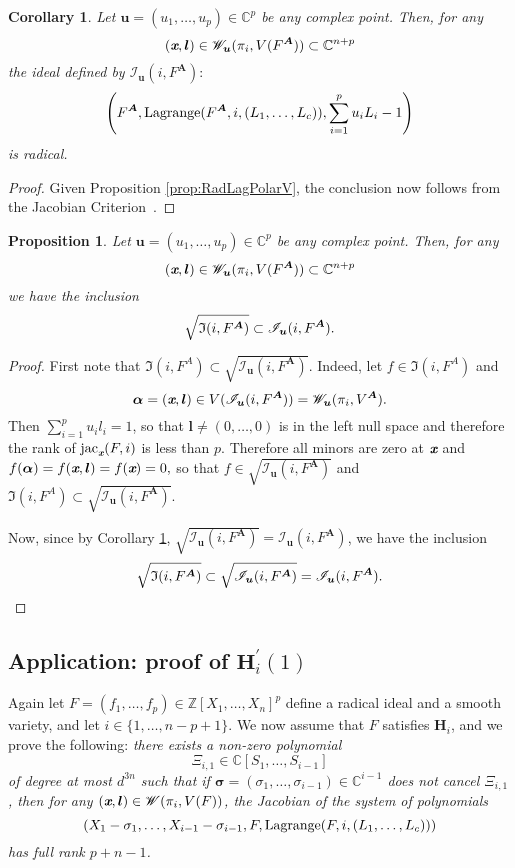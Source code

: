 \documentclass[a4paper]{article}
\def\sW{\mathscr{W}}
\def\sI{\mathscr{I}}
\def\mA{{\bm A}}
\def\ub{{\bm u}}
\def\lb{{\bm l}}
\def\xb{\textit{\textbf{x}}}
\DeclareMathOperator{\jac}{jac}
\DeclareMathOperator{\lag}{Lagrange}
\newcommand{\ZZ}{{\mathbb{Z}}}
\def\C{\mathbb{C}}
\def\IiA{\mathfrak{I}(i,F^A)}
\def\lagF{{\bm\lag}(F,i,(L_1,\hdots,L_c))}
\def\lagFA{{\bm\lag}(F^{\mA},i,(L_1,\hdots,L_c))}
\def\IilA{\mathscr{I}_{\ub}(i,F^{\mA})}
\def\WilA{\mathscr{W}_{\ub}(\pi_i,V^{\mA})}
\newtheorem{corollary}[theorem]{Corollary}
\newtheorem{prop}[theorem]{Proposition}
\begin{document}
    \begin{corollary}\label{cor:LagIdealRadical}
Let $\ub = (u_1,\hdots,u_p) \in \C^p$ be any complex point. Then, for any \[(\xb,\lb)\in \mathscr{W}_{\ub}(\pi_i,V(F^{\mA})) \subset \C^{n+p}\] the ideal defined by $\sI_{\ub}(i,F^{\mA}) :$\[ \left(F^{\mA},\lagFA,\sum_{i=1}^p u_iL_i-1\right)\] is radical.
    \end{corollary}
    \begin{proof}
    Given Proposition \ref{prop:RadLagPolarV}, the conclusion now follows from the Jacobian Criterion~\cite[Corollary 16.20]{ECA}.
    \end{proof}
    \begin{prop}\label{prop:polarVs2}
Let $\ub = (u_1,\hdots,u_p) \in \C^p$ be any complex point. Then, for any \[(\xb,\lb)\in \mathscr{W}_{\ub}(\pi_i,V(F^{\mA})) \subset \C^{n+p}\]we have the inclusion
    \[
    \sqrt{\frak{I}(i,F^{\mA})} \subset \IilA.
    \]
    \end{prop}
    \begin{proof}
    First note that $\IiA \subset \sqrt{\IilA}.$ Indeed, let $f \in \IiA$ and \[\bm \alpha = (\xb,\lb) \in V(\IilA)=\WilA.\] Then $\sum_{i=1}^p u_i l_i = 1$, so that $\lb \not = (0,\hdots,0)$ is in the left null space and therefore the rank of $\jac_{\xb} (F,i)$ is less than $p.$ Therefore all minors are zero at $\xb$ and $f(\bm \alpha)= f(\xb,\lb)=f(\xb)=0,$ so that $f \in \sqrt{\IilA}$ and $\IiA \subset \sqrt{\IilA}.$
    \par 
    Now, since by Corollary \ref{cor:LagIdealRadical}, $\sqrt{\IilA} = \IilA$, we have the inclusion
    \[
    \sqrt{\frak{I}(i,F^{\mA})} \subset \sqrt{\IilA} = \IilA.
    \]
    \end{proof}


\subsection{Application: proof of $\textbf{H}_i^{'}(1)$}\label{proof:hip}
Again let $F = (f_1,\hdots,f_p) \in \ZZ[X_1,\hdots,X_n]^p$  define a radical ideal and a smooth variety, and let $i\in \{1,\hdots,n-p+1\}$. We now assume
that $F$ satisfies $\textbf{H}_i$, and we prove the following: {\em
  there exists a non-zero polynomial 
  \[
  \Xi_{i,1} \in
  \C[S_1,\dots,S_{i-1}]
  \]
  of degree at most $d^{3n}$ such that if $
  \bm \sigma = (\sigma_1,\hdots,\sigma_{i-1}) \in \C^{i-1}$ does not cancel
  $\Xi_{i,1}$, then for any $(\xb,\lb) \in \sW(\pi_i,V(F))$, the Jacobian of the system of polynomials
  $$\left(X_1-\sigma_1,\dots,X_{i-1}-\sigma_{i-1},F,\lagF\right)$$ has full rank $p+n-1$.}
\end{document}
